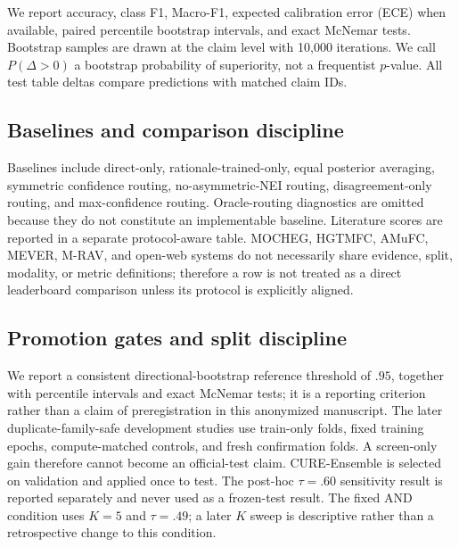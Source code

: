 \documentclass[11pt]{article}
\begin{document}
We report accuracy, class F1, Macro-F1, expected calibration error (ECE) when available, paired percentile bootstrap intervals, and exact McNemar tests. Bootstrap samples are drawn at the claim level with 10,000 iterations. We call $P(\Delta>0)$ a bootstrap probability of superiority, not a frequentist $p$-value. All test table deltas compare predictions with matched claim IDs.

\subsection{Baselines and comparison discipline}
Baselines include direct-only, rationale-trained-only, equal posterior averaging, symmetric confidence routing, no-asymmetric-NEI routing, disagreement-only routing, and max-confidence routing. Oracle-routing diagnostics are omitted because they do not constitute an implementable baseline. Literature scores are reported in a separate protocol-aware table. MOCHEG, HGTMFC, AMuFC, MEVER, M-RAV, and open-web systems do not necessarily share evidence, split, modality, or metric definitions; therefore a row is not treated as a direct leaderboard comparison unless its protocol is explicitly aligned.

\subsection{Promotion gates and split discipline}
We report a consistent directional-bootstrap reference threshold of $.95$, together with percentile intervals and exact McNemar tests; it is a reporting criterion rather than a claim of preregistration in this anonymized manuscript. The later duplicate-family-safe development studies use train-only folds, fixed training epochs, compute-matched controls, and fresh confirmation folds. A screen-only gain therefore cannot become an official-test claim. CURE-Ensemble is selected on validation and applied once to test. The post-hoc $\tau=.60$ sensitivity result is reported separately and never used as a frozen-test result. The fixed AND condition uses $K=5$ and $\tau=.49$; a later $K$ sweep is descriptive rather than a retrospective change to this condition.
\end{document}
